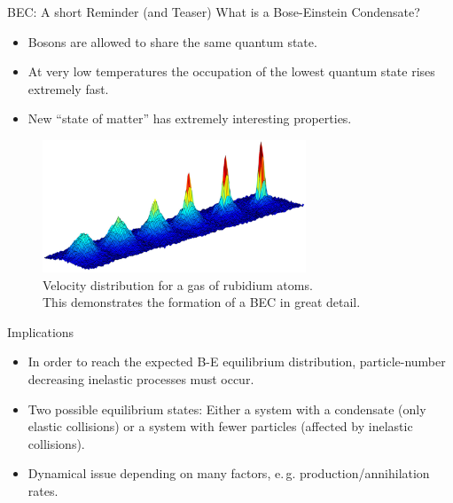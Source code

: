 \begin{frame}{BEC: A short Reminder (and Teaser)}
\vspace{0.5em}
What is a Bose-Einstein Condensate?\\[0.5em]

\begin{itemize}
	\item Bosons are allowed to share the same quantum state.
	\item At very low temperatures the occupation of the lowest quantum state rises extremely fast. 
	\item New \enquote{state of matter} has extremely interesting properties. 
\end{itemize}
\begin{figure}
	\centering
	\includegraphics[width=0.7\textwidth]{figures/bec2}
	\caption{Velocity distribution for a gas of rubidium atoms.\footnotemark \\ 
	This demonstrates the formation of a BEC in great detail.}
\end{figure}
\end{frame}


\begin{frame}{Implications}
\begin{itemize}
	\item In order to reach the expected B-E equilibrium distribution, particle-number decreasing \alert{inelastic} processes must occur.
	\item Two possible equilibrium states: Either a system with a condensate (only elastic collisions) or a system with fewer particles (affected by inelastic collisions).
	\item Dynamical issue depending on many factors, e.\,g. production/annihilation rates.
\end{itemize}
\end{frame}

